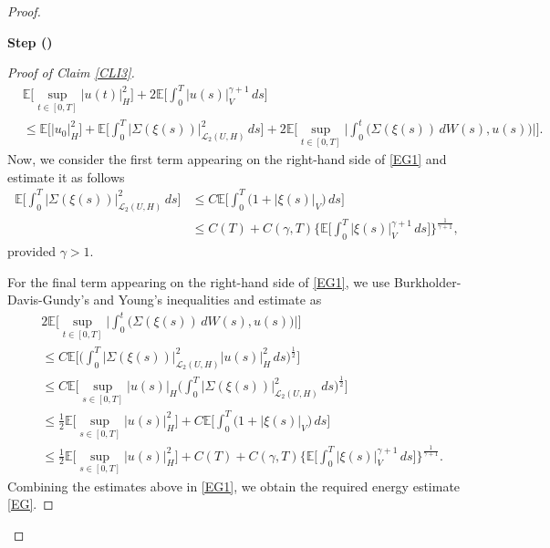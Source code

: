 \documentclass[english,a4paper,11pt]{amsart}
\theoremstyle{plain}
\theoremstyle{definition}
\theoremstyle{remark}
\numberwithin{equation}{section}
\newcounter{lil1}
\newenvironment{step}
{\begin{list} { \bf Step (\Roman{lil1})}
		{ \usecounter{lil1}
			\setlength{\leftmargin}{0.0cm}
			\setlength{\topsep}{0.2cm}
			\setlength{\itemsep}{0.0cm}
			\setlength{\parsep}{0.1cm}
			\setlength{\itemindent}{0.8cm}
			\setlength{\parskip}{0.0cm}}}
	{\end{list}}
\newcounter{lil33}
\newcounter{lil1q}
\newcommand{\EE}{ \mathbb{E} }
\begin{document}
\begin{proof}
\begin{step}
\begin{proof}[Proof of Claim \ref{CLI3}]
\begin{align}
&	\EE\bigg[\sup_{t\in[0,T]} | u(t) | _H^2\bigg]+ 2\EE\bigg[\int_0^T | u(s) | _V^{\gamma+1}\,ds \bigg]
	\\& \leq \EE\big[ | u_0 | _{H}^2\big]+\EE\bigg[\int_0^T | \Sigma(\xi(s))  | _{\mathcal{L}_2(U,H)}^2\,ds\bigg]+2\EE\bigg[\sup_{t\in [0,T]}\bigg|\int_0^t \big(\Sigma(\xi(s))\, dW(s),u(s)\big)\bigg|\bigg]. 
\end{align}Now, we consider the first term appearing on the right-hand side of \eqref{EG1} and estimate it as follows
\begin{align*}
	\EE\bigg[\int_0^T |\Sigma(\xi(s)) | _{\mathcal{L}_2(U,H)}^2\,ds\bigg]& \leq C	\EE\bigg[\int_0^T \big(1+| \xi(s) |_V\big)\,ds\bigg]
 \\&\leq C (T)+C(\gamma,T)	\bigg\{\EE\bigg[\int_0^T |  \xi(s) | _{V}^{\gamma+1}\,ds\bigg]\bigg\}^{\frac{1}{\gamma+1}}, 
\end{align*}provided $\gamma>1$.

For the final term appearing on the right-hand side of \eqref{EG1}, we use Burkholder-Davis-Gundy's and Young's inequalities and estimate as
\begin{align*}
&	2\EE\bigg[\sup_{t\in [0,T]}\bigg|\int_0^t \big(\Sigma(\xi(s))\, dW(s),u(s)\big)\bigg|\bigg] 
	\\& \leq C \EE\bigg[\bigg(\int_0^T  | \Sigma(\xi(s))| _{\mathcal{L}_2(U,H)}^2 | u(s) | _{H}^2\,ds\bigg)^{\frac{1}{2}}\bigg]
	\\& \leq C \EE\bigg[\sup_{s\in[0,T]} | u(s) | _{H}\bigg(\int_0^T   | \Sigma(\xi(s))| _{\mathcal{L}_2(U,H)}^2 \,ds\bigg)^{\frac{1}{2}}\bigg]
	\\& 
	\leq \frac{1}{2}\EE\bigg[\sup_{s\in[0,T]} | u(s) | _{H}^2\bigg]+ C	\EE\bigg[\int_0^T \big(1+| \xi(s) |_V\big)\,ds\bigg]
	\\& 
	\leq \frac{1}{2}\EE\bigg[\sup_{s\in[0,T]} | u(s) | _{H}^2\bigg]+C (T)+C(\gamma,T)	\bigg\{\EE\bigg[\int_0^T |  \xi(s) | _{V}^{\gamma+1}\,ds\bigg]\bigg\}^{\frac{1}{\gamma+1}}. 
\end{align*}
Combining the estimates above in \eqref{EG1}, we obtain the required energy estimate \eqref{EG}. 
\end{proof}




\end{step}
\end{proof}
\end{document}
